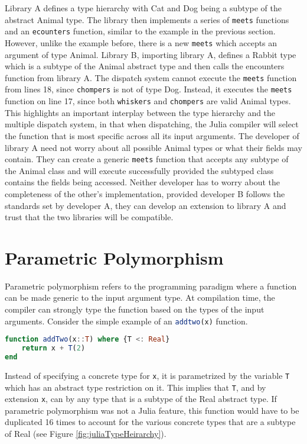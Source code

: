Library A defines a type hierarchy with Cat and Dog being a subtype of the abstract Animal type. The library then
implements a series of \lstinline[language=Julia]{meets} functions and an \lstinline[language=Julia]{ecounters}
function, similar to the example in the previous section. However, unlike the example before, there is a new
\lstinline[language=Julia]{meets} which accepts an argument of type Animal. Library B, importing library A, defines a
Rabbit type which is a subtype of the Animal abstract type and then calls the encounters function from library A. The
dispatch system cannot execute the \lstinline[language=Julia]{meets} function from lines 18, since
\lstinline[language=Julia]{chompers} is not of type Dog. Instead, it executes the \lstinline[language=Julia]{meets}
function on line 17, since both \lstinline[language=Julia]{whiskers} and \lstinline[language=Julia]{chompers} are valid
Animal types. This highlights an important interplay between the type hierarchy and the multiple dispatch system, in
that when dispatching, the Julia compiler will select the function that is most specific across all its input arguments.
The developer of library A need not worry about all possible Animal types or what their fields may contain.
They can create a generic \lstinline[language=Julia]{meets} function that accepts any subtype of the Animal class and
will execute successfully provided the subtyped class contains the fields being accessed. Neither developer has to worry
about the completeness of the other's implementation, provided developer B follows the standards set by developer A,
they can develop an extension to library A and trust that the two libraries will be compatible.

\section{Parametric Polymorphism}
Parametric polymorphism refers to the programming paradigm where a function can be made generic to the input argument
type. At compilation time, the compiler can strongly type the function based on the types of the input arguments.
Consider the simple example of an \lstinline[language=Julia]{addtwo(x)} function.
\begin{lstlisting}[language=Julia]
function addTwo(x::T) where {T <: Real}
    return x + T(2)
end
\end{lstlisting}
Instead of specifying a concrete type for \lstinline[language=Julia]{x}, it is parametrized by the variable
\lstinline[language=Julia]{T} which has an abstract type restriction on it. This implies that
\lstinline[language=Julia]{T}, and by extension \lstinline[language=Julia]{x}, can by any type that is a subtype of the
Real abstract type. If parametric polymorphism was not a Julia feature, this function would have to be duplicated 16
times to account for the various concrete types that are a subtype of Real (see Figure \ref{fig:juliaTypeHeirarchy}).

